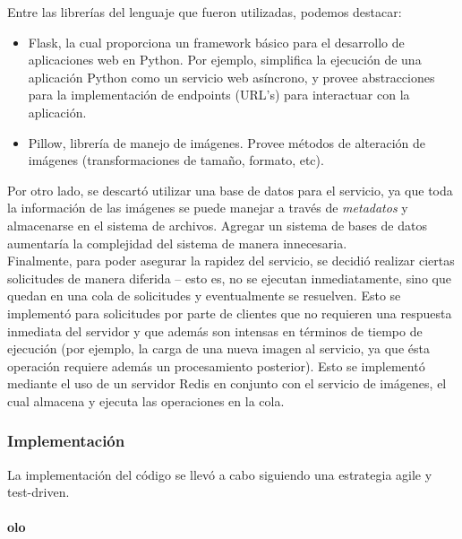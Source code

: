 \documentclass[11pt,letterpaper]{article}
\begin{document}
Entre las librerías del lenguaje que fueron utilizadas, podemos destacar:
\begin{itemize}
    \item Flask\cite{flask}, la cual proporciona un framework básico para el desarrollo de aplicaciones web en Python. Por ejemplo, simplifica la ejecución de una aplicación Python como un servicio web asíncrono, y provee abstracciones para la implementación de endpoints (URL's) para interactuar con la aplicación.
    \item Pillow\cite{pillow}, librería de manejo de imágenes. Provee métodos de alteración de imágenes (transformaciones de tamaño, formato, etc).
\end{itemize}

Por otro lado, se descartó utilizar una base de datos para el servicio, ya que toda la información de las imágenes se puede manejar a través de \emph{metadatos} y almacenarse en el sistema de archivos. Agregar un sistema de bases de datos aumentaría la complejidad del sistema de manera innecesaria.\\

Finalmente, para poder asegurar la rapidez del servicio, se decidió realizar ciertas solicitudes de manera diferida -- esto es, no se ejecutan inmediatamente, sino que quedan en una cola de solicitudes y eventualmente se resuelven. Esto se implementó para solicitudes por parte de clientes que no requieren una respuesta inmediata del servidor y que además son intensas en términos de tiempo de ejecución (por ejemplo, la carga de una nueva imagen al servicio, ya que ésta operación requiere además un procesamiento posterior). Esto se implementó mediante el uso de un servidor Redis en conjunto con el servicio de imágenes, el cual almacena y ejecuta las operaciones en la cola.


\subsubsection{Implementación}

La implementación del código se llevó a cabo siguiendo una estrategia agile y test-driven.

\paragraph{olo}

\newpage
\end{document}
